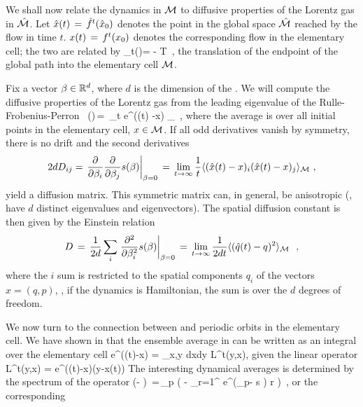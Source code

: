 \documentclass[aps,pre,showpacs,preprint,groupedaddress,floatfix]{revtex4-1}
\begin{document}
We shall now relate the dynamics in ${\cal M}$ to diffusive properties of
the Lorentz gas in $\hat {{\cal M}}$. Let $\hat x(t)\,=\,{\hat{f}^{t}(\hat x_0)}$ denotes the
point in the global space $\hat {{\cal M}}$ reached by the flow in time
$t$. $x(t)\,=\,{f^{t}({x_0})}$ denotes the corresponding flow in the
elementary cell; the two are related by
 \beq \hn_t(\xInit)=
 -  \in T \,, 
the translation of the endpoint of the global path into the elementary
cell $\pS$.

Fix a vector $\beta \in \reals^d$, where $d$ is the dimension of the
{\statesp}. We will compute the diffusive properties of the Lorentz
gas from the leading eigenvalue of the Rulle-Frobenius-Perron \evOper\
\beq \eigenvL(\beta)\,=\, \lim_{t \rightarrow \infty}  \log
\langle e^{\beta \cdot (\hx(t) -x) } \rangle_\pS ~, \quad
{}
where the average is over all initial points in the elementary cell,
$x \in \pS$. If all odd derivatives vanish by symmetry, there is no drift and the second derivatives
\[
2d D_{ij} = \left . {\frac{\partial}{\partial \beta_i}}
  {\frac{\partial} {\partial \beta_j}} \eigenvL(\beta)\right
|_{\beta=0} \,=\,\lim_{t\rightarrow \infty} {\frac{1}{t}} \langle
{(\hx(t) -x)_i (\hx(t) -x)_j } \rangle_\pS ~,
\]
yield a diffusion matrix.  This symmetric matrix can, in general, be
anisotropic (\ie, have $d$ distinct eigenvalues and
eigen\-vectors). The spatial diffusion constant is then given by the
Einstein relation
\[
D\,=\,{1\over 2 d} \sum_i \left .{{\partial}^2 \over {\partial
      \beta^2_i}} s(\beta)\right |_{\beta=0} \,=\,
\lim_{t\rightarrow \infty} {1\over{2d t}} \langle {(\hat{q}(t) -q)^2 }
\rangle_{{\cal M}}~ ~,
\]
where the $i$ sum is restricted to the spatial components $q_i$ of the
{\statesp} vectors $x=(q,p)$, \ie, if the dynamics is Hamiltonian, the
sum is over the $d$ degrees of freedom.


We now turn to the connection between  and periodic
orbits in the elementary cell. We have shown in \refref{CGS92} that the ensemble average in  can be written as an integral over the elementary cell
\beq
\langle e^{\beta\cdot(\hx(t)-x)} \rangle = \int_{x,y\in \pS} dxdy {\cal L}^t(y,x),
\eeq
given the linear \evOper operator
\beq
{\cal L}^t(y,x) = e^{\beta\cdot(\hx(t)-x)}\delta(y-x(t))
\eeq
The interesting dynamical averages is determined by the spectrum of the
operator
 \beq \det(\eigenvL - \Lop) \,=\,\prod_{p} \exp \left(
  - { \sum_{r=1}^ { e^{(\beta \cdot \hn_p- s
        ) r}
      \over {} }
  } \right) \,,  
or the corresponding \dzeta\
 
\end{document}
